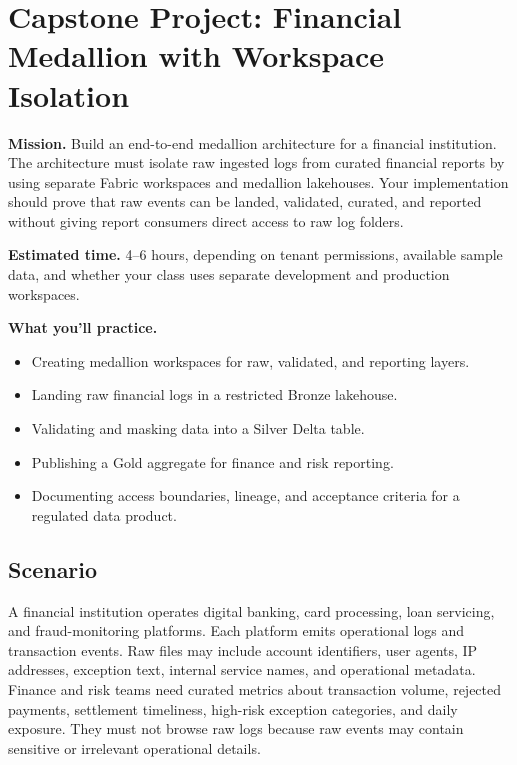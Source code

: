 \section{Capstone Project: Financial Medallion with Workspace Isolation}\label{sec:ch2-capstone}

\begin{capstonebox}
\textbf{Mission.} Build an end-to-end medallion architecture for a financial institution. The architecture must isolate raw ingested logs from curated financial reports by using separate Fabric workspaces and medallion lakehouses. Your implementation should prove that raw events can be landed, validated, curated, and reported without giving report consumers direct access to raw log folders.

\textbf{Estimated time.} 4--6 hours, depending on tenant permissions, available sample data, and whether your class uses separate development and production workspaces.

\textbf{What you'll practice.}
\begin{itemize}
    \item Creating medallion workspaces for raw, validated, and reporting layers.
    \item Landing raw financial logs in a restricted Bronze lakehouse.
    \item Validating and masking data into a Silver Delta table.
    \item Publishing a Gold aggregate for finance and risk reporting.
    \item Documenting access boundaries, lineage, and acceptance criteria for a regulated data product.
\end{itemize}
\end{capstonebox}

\subsection*{Scenario}
A financial institution operates digital banking, card processing, loan servicing, and fraud-monitoring platforms. Each platform emits operational logs and transaction events. Raw files may include account identifiers, user agents, IP addresses, exception text, internal service names, and operational metadata. Finance and risk teams need curated metrics about transaction volume, rejected payments, settlement timeliness, high-risk exception categories, and daily exposure. They must not browse raw logs because raw events may contain sensitive or irrelevant operational details.

